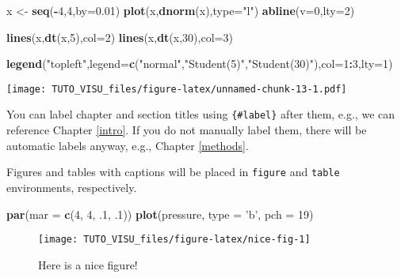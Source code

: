 \documentclass[]{book}
\newenvironment{Shaded}{\begin{snugshade}}{\end{snugshade}}
\newcommand{\DataTypeTok}[1]{\textcolor[rgb]{0.13,0.29,0.53}{#1}}
\newcommand{\DecValTok}[1]{\textcolor[rgb]{0.00,0.00,0.81}{#1}}
\newcommand{\FloatTok}[1]{\textcolor[rgb]{0.00,0.00,0.81}{#1}}
\newcommand{\KeywordTok}[1]{\textcolor[rgb]{0.13,0.29,0.53}{\textbf{#1}}}
\newcommand{\NormalTok}[1]{#1}
\newcommand{\OperatorTok}[1]{\textcolor[rgb]{0.81,0.36,0.00}{\textbf{#1}}}
\newcommand{\StringTok}[1]{\textcolor[rgb]{0.31,0.60,0.02}{#1}}
\theoremstyle{definition}
\theoremstyle{definition}
\theoremstyle{definition}
\theoremstyle{remark}
\begin{document}
\begin{Shaded}
\begin{Highlighting}[]
\NormalTok{x <-}\StringTok{ }\KeywordTok{seq}\NormalTok{(}\OperatorTok{-}\DecValTok{4}\NormalTok{,}\DecValTok{4}\NormalTok{,}\DataTypeTok{by=}\FloatTok{0.01}\NormalTok{)}
\KeywordTok{plot}\NormalTok{(x,}\KeywordTok{dnorm}\NormalTok{(x),}\DataTypeTok{type=}\StringTok{"l"}\NormalTok{)}
\KeywordTok{abline}\NormalTok{(}\DataTypeTok{v=}\DecValTok{0}\NormalTok{,}\DataTypeTok{lty=}\DecValTok{2}\NormalTok{)}

\KeywordTok{lines}\NormalTok{(x,}\KeywordTok{dt}\NormalTok{(x,}\DecValTok{5}\NormalTok{),}\DataTypeTok{col=}\DecValTok{2}\NormalTok{)}
\KeywordTok{lines}\NormalTok{(x,}\KeywordTok{dt}\NormalTok{(x,}\DecValTok{30}\NormalTok{),}\DataTypeTok{col=}\DecValTok{3}\NormalTok{)}

\KeywordTok{legend}\NormalTok{(}\StringTok{"topleft"}\NormalTok{,}\DataTypeTok{legend=}\KeywordTok{c}\NormalTok{(}\StringTok{"normal"}\NormalTok{,}\StringTok{"Student(5)"}\NormalTok{,}\StringTok{"Student(30)"}\NormalTok{),}\DataTypeTok{col=}\DecValTok{1}\OperatorTok{:}\DecValTok{3}\NormalTok{,}\DataTypeTok{lty=}\DecValTok{1}\NormalTok{)}
\end{Highlighting}
\end{Shaded}

\texttt{[image: TUTO\_VISU\_files/figure-latex/unnamed-chunk-13-1.pdf]}

You can label chapter and section titles using \texttt{\{\#label\}} after them, e.g., we can reference Chapter \ref{intro}. If you do not manually label them, there will be automatic labels anyway, e.g., Chapter \ref{methods}.

Figures and tables with captions will be placed in \texttt{figure} and \texttt{table} environments, respectively.

\begin{Shaded}
\begin{Highlighting}[]
\KeywordTok{par}\NormalTok{(}\DataTypeTok{mar =} \KeywordTok{c}\NormalTok{(}\DecValTok{4}\NormalTok{, }\DecValTok{4}\NormalTok{, }\FloatTok{.1}\NormalTok{, }\FloatTok{.1}\NormalTok{))}
\KeywordTok{plot}\NormalTok{(pressure, }\DataTypeTok{type =} \StringTok{'b'}\NormalTok{, }\DataTypeTok{pch =} \DecValTok{19}\NormalTok{)}
\end{Highlighting}
\end{Shaded}

\begin{figure}

{\centering \texttt{[image: TUTO\_VISU\_files/figure-latex/nice-fig-1]} 

}

\caption{Here is a nice figure!}\label{fig:nice-fig}
\end{figure}
\end{document}
